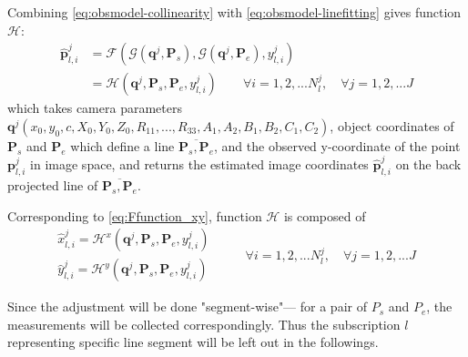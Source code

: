 Combining \eqref{eq:obsmodel-collinearity} with \eqref{eq:obsmodel-linefitting} gives function $\mathcal{H}$:
\begin{equation} \label{eq:obsmodel}
\begin{split}
\hat{\mathbf{p}}^j_{l,i} &= \mathcal{F}(\mathcal{G}(\mathbf{q}^j,\mathbf{P}_s),\mathcal{G}(\mathbf{q}^j,\mathbf{P}_e),y^j_{l,i})\\
&=\mathcal{H}(\mathbf{q}^j,\mathbf{P}_s,\mathbf{P}_e,y^j_{l,i})
\qquad
\forall i=1,2,...N^j_l,\quad\forall j=1,2,...J
\end{split}
\end{equation}
which takes camera parameters $\mathbf{q}^j(x_0,y_0,c,X_0,Y_0,Z_0,R_{11},...,R_{33},A_1,A_2,B_1,B_2,C_1,C_2)$, object coordinates of $\mathbf{P}_s$ and $\mathbf{P}_e$ which define a line $\overline{\mathbf{P}_s,\mathbf{P}_e}$, and the observed y-coordinate of the point $\mathbf{p}^j_{l,i}$ in image space, and returns the estimated image coordinates $\hat{\mathbf{p}}^j_{l,i}$ on the back projected line of $\overline{\mathbf{P}_s,\mathbf{P}_e}$.

Corresponding to \cref{eq:Ffunction_xy}, function $\mathcal{H}$ is composed of
\begin{equation} \label{eq:obsmodel2}
\begin{split}
\hat{x}^j_{l,i} = \mathcal{H}^x(\mathbf{q}^j,\mathbf{P}_s,\mathbf{P}_e,y^j_{l,i})\\
\hat{y}^j_{l,i} = \mathcal{H}^y(\mathbf{q}^j,\mathbf{P}_s,\mathbf{P}_e,y^j_{l,i})
\end{split}
\qquad
\begin{split}
\forall i=1,2,...N^j_l,\quad\forall j=1,2,...J
\end{split}
\end{equation}

Since the adjustment will be done "segment-wise"--- for a pair of $P_s$ and $P_e$, the measurements will be collected correspondingly. %
Thus the subscription $l$ representing specific line segment will be left out in the followings.

